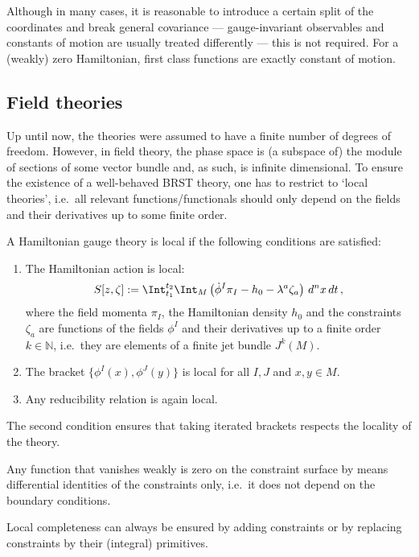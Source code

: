     Although in many cases, it is reasonable to introduce a certain split of the coordinates and break general covariance --- gauge-invariant observables and constants of motion are usually treated differently --- this is not required. For a (weakly) zero Hamiltonian, first class functions are exactly constant of motion.

\subsection{Field theories}

    Up until now, the theories were assumed to have a finite number of degrees of freedom. However, in field theory, the phase space is (a subspace of) the module of sections of some vector bundle and, as such, is infinite dimensional. To ensure the existence of a well-behaved BRST theory, one has to restrict to `local theories', i.e.~all relevant functions/functionals should only depend on the fields and their derivatives up to some finite order.
    \begin{axiom}[Locality]
        A Hamiltonian gauge theory is local if the following conditions are satisfied:
        \begin{enumerate}
            \item The Hamiltonian action is local:
            \begin{gather}
                \label{constraint:hamiltonian_action}
                S[z,\zeta] := \Int_{t_1}^{t_2}\Int_M\left(\dot{\phi}^I\pi_I-h_0-\lambda^a\zeta_a\right)\,d^nx\,dt\,,
            \end{gather}
            where the field momenta $\pi_I$, the Hamiltonian density $h_0$ and the constraints $\zeta_a$ are functions of the fields $\phi^I$ and their derivatives up to a finite order $k\in\mathbb{N}$, i.e.~they are elements of a finite jet bundle $J^k(M)$.
            \item The bracket $\{\phi^I(x),\phi^J(y)\}$ is local for all $I,J$ and $x,y\in M$.
            \item Any reducibility relation is again local.
        \end{enumerate}
        The second condition ensures that taking iterated brackets respects the locality of the theory.
    \end{axiom}

    \begin{axiom}
        Any function that vanishes weakly is zero on the constraint surface by means differential identities of the constraints only, i.e.~it does not depend on the boundary conditions.
    \end{axiom}
    \begin{remark}
        Local completeness can always be ensured by adding constraints or by replacing constraints by their (integral) primitives.
    \end{remark}

